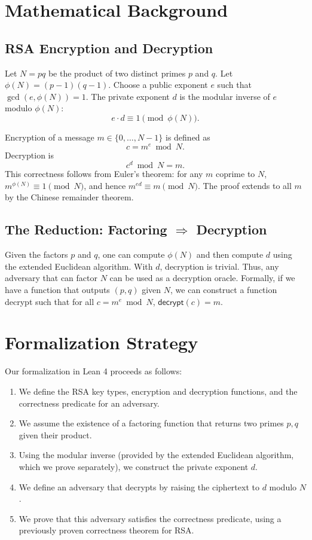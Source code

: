 \documentclass[12pt,a4paper]{article}
\begin{document}
\section{Mathematical Background}

\subsection{RSA Encryption and Decryption}

Let \(N = p q\) be the product of two distinct primes \(p\) and \(q\). Let \(\phi(N) = (p-1)(q-1)\). Choose a public exponent \(e\) such that \(\gcd(e, \phi(N)) = 1\). The private exponent \(d\) is the modular inverse of \(e\) modulo \(\phi(N)\):
\[
e \cdot d \equiv 1 \pmod{\phi(N)}.
\]

Encryption of a message \(m \in \{0, \ldots, N-1\}\) is defined as
\[
c = m^e \bmod N.
\]
Decryption is
\[
c^d \bmod N = m.
\]
This correctness follows from Euler's theorem: for any \(m\) coprime to \(N\), \(m^{\phi(N)} \equiv 1 \pmod N\), and hence \(m^{ed} \equiv m \pmod N\). The proof extends to all \(m\) by the Chinese remainder theorem.

\subsection{The Reduction: Factoring \(\Rightarrow\) Decryption}

Given the factors \(p\) and \(q\), one can compute \(\phi(N)\) and then compute \(d\) using the extended Euclidean algorithm. With \(d\), decryption is trivial. Thus, any adversary that can factor \(N\) can be used as a decryption oracle. Formally, if we have a function that outputs \((p,q)\) given \(N\), we can construct a function \textsf{decrypt} such that for all \(c = m^e \bmod N\), \(\textsf{decrypt}(c) = m\).

\section{Formalization Strategy}

Our formalization in Lean 4 proceeds as follows:

\begin{enumerate}
\item We define the RSA key types, encryption and decryption functions, and the correctness predicate for an adversary.
\item We assume the existence of a factoring function that returns two primes \(p,q\) given their product.
\item Using the modular inverse (provided by the extended Euclidean algorithm, which we prove separately), we construct the private exponent \(d\).
\item We define an adversary that decrypts by raising the ciphertext to \(d\) modulo \(N\).
\item We prove that this adversary satisfies the correctness predicate, using a previously proven correctness theorem for RSA.
\end{enumerate}
\end{document}
